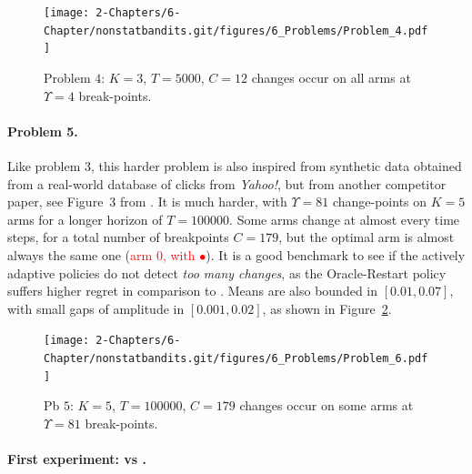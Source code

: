 \begin{figure}[h!]  %
    \centering
    \texttt{[image: 2-Chapters/6-Chapter/nonstatbandits.git/figures/6\_Problems/Problem\_4.pdf]}
    \caption{Problem $4$: $K=3$, $T=5000$, $C=12$ changes occur on all arms at $\Upsilon=4$ break-points.}
    \label{fig:6:Problem_4}
\end{figure}


\paragraph{Problem 5.}

Like problem $3$, this harder problem is also inspired from synthetic data obtained from a real-world database of clicks from \emph{Yahoo!}, but from another competitor paper, see Figure~3 from \cite{LiuLeeShroff17}.
%
It is much harder, with $\Upsilon=81$ change-points on $K=5$ arms for a longer horizon of $T=100000$.
Some arms change at almost every time steps, for a total number of breakpoints $C=179$, but the optimal arm is almost always the same one (\textcolor{red}{arm $0$, with $\bullet$}).
It is a good benchmark to see if the actively adaptive policies do not detect \emph{too many changes}, as the Oracle-Restart policy suffers higher regret in comparison to \klUCB.
Means are also bounded in $[0.01, 0.07]$, with small gaps of amplitude in $[0.001, 0.02]$,
as shown in Figure~\ref{fig:6:Problem_6}.

\begin{figure}[h!]  %
    \centering
    \texttt{[image: 2-Chapters/6-Chapter/nonstatbandits.git/figures/6\_Problems/Problem\_6.pdf]}
    \caption{Pb $5$: $K=5$, $T=100000$, $C=179$ changes occur on some arms at $\Upsilon=81$ break-points.}
    \label{fig:6:Problem_6}
\end{figure}





\paragraph{First experiment: \UCB{} vs \klUCB{}.}
%

